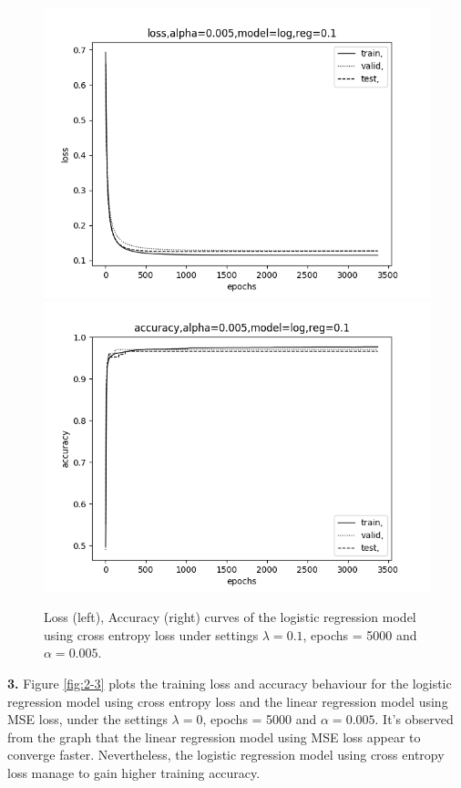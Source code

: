 \documentclass[12pt]{article}
\newenvironment{problem}[2][Problem]{\begin{trivlist}
\item[\hskip \labelsep {\bfseries #1}\hskip \labelsep {\bfseries #2.}]}{\end{trivlist}}
\begin{document}
\begin{problem}{2}
\begin{figure}[!htb]
  \includegraphics[width=\linewidth]{images/a1/2.2/loss_logistic.png}
\endminipage\hfill
{}
  \includegraphics[width=\linewidth]{images/a1/2.2/accuracy_logistic.png}
\endminipage
\caption{Loss (left), Accuracy (right) curves of the logistic regression model using cross entropy loss under settings $\lambda=0.1$, epochs = 5000 and $\alpha=0.005$.}\label{fig:2-2}
\end{figure}


\newpage
\textbf{3. } Figure \ref{fig:2-3} plots the training loss and accuracy behaviour for the logistic regression model using cross entropy loss and the linear regression model using MSE loss, under the settings $\lambda=0$, epochs = 5000 and $\alpha=0.005$. It's observed from the graph that the linear regression model using MSE loss appear to converge faster. Nevertheless, the logistic regression model using cross entropy loss manage to gain higher training accuracy.


\end{problem}
\end{document}
